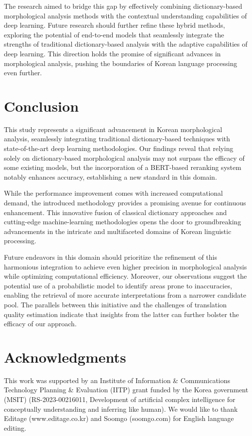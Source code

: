 \documentclass[AMS,STIX2COL]{WileyNJD-v2}
\begin{document}
    The research aimed to bridge this gap by effectively combining dictionary-based morphological analysis methods with the contextual understanding capabilities of deep learning.
    Future research should further refine these hybrid methods, exploring the potential of end-to-end models that seamlessly integrate the strengths of traditional dictionary-based analysis with the adaptive capabilities of deep learning.
    This direction holds the promise of significant advances in morphological analysis, pushing the boundaries of Korean language processing even further.


    \section{Conclusion}\label{sec:conclusion}

    This study represents a significant advancement in Korean morphological analysis, seamlessly integrating traditional dictionary-based techniques with state-of-the-art deep learning methodologies.
    Our findings reveal that relying solely on dictionary-based morphological analysis may not surpass the efficacy of some existing models, but the incorporation of a BERT-based reranking system notably enhances accuracy, establishing a new standard in this domain.

    While the performance improvement comes with increased computational demand, the introduced methodology provides a promising avenue for continuous enhancement.
    This innovative fusion of classical dictionary approaches and cutting-edge machine-learning methodologies opens the door to groundbreaking advancements in the intricate and multifaceted domains of Korean linguistic processing.

    Future endeavors in this domain should prioritize the refinement of this harmonious integration to achieve even higher precision in morphological analysis while optimizing computational efficiency.
    Moreover, our observations suggest the potential use of a probabilistic model to identify areas prone to inaccuracies, enabling the retrieval of more accurate interpretations from a narrower candidate pool.
    The parallels between this initiative and the challenges of translation quality estimation indicate that insights from the latter can further bolster the efficacy of our approach.


    \section*{Acknowledgments}
    This work was supported by an Institute of Information \& Communications Technology Planning \& Evaluation (IITP) grant funded by the Korea government (MSIT) (RS-2023-00216011, Development of artificial complex intelligence for conceptually understanding and inferring like human).
    We would like to thank Editage (www.editage.co.kr) and Soomgo (soomgo.com) for English language editing.
\end{document}
